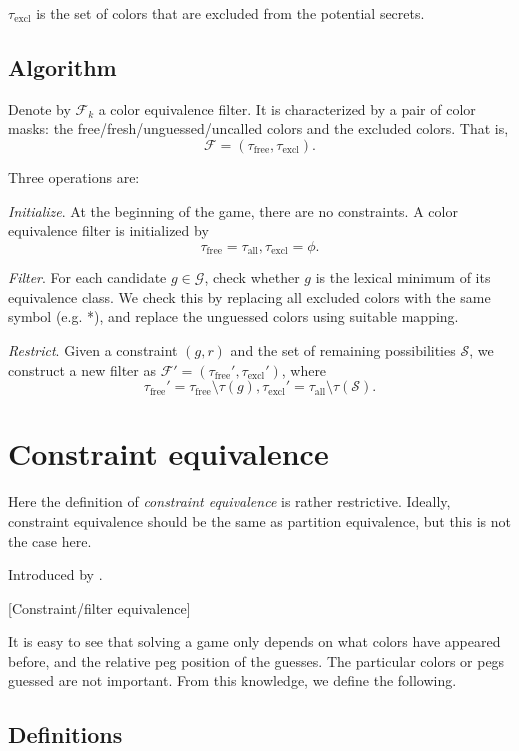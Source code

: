 $\tau_{\text{excl}}$ is the set of colors that are excluded from the potential secrets.


\subsection{Algorithm}

\newcommand{\cmall}{\tau_\text{all}}
\newcommand{\cmfree}{\tau_\text{free}}
\newcommand{\cmexcl}{\tau_\text{excl}}

Denote by $\mathcal{F}_k$ a color equivalence filter. It is characterized by a pair of color masks: the free/fresh/unguessed/uncalled colors and the excluded colors. That is,
\[
\mathcal{F} = (\tau_\text{free}, \tau_\text{excl}) .
\]

Three operations are:

\emph{Initialize}. At the beginning of the game, there are no constraints. A color equivalence filter is initialized by
\[
\cmfree = \cmall, \cmexcl = \phi .
\]

\emph{Filter}. For each candidate $g \in \mathcal{G}$, check whether $g$ is the lexical minimum of its equivalence class. We check this by replacing all excluded colors with the same symbol (e.g. *), and replace the unguessed colors using suitable mapping.

\emph{Restrict}. Given a constraint $(g,r)$ and the set of remaining possibilities $\mathcal{S}$, we construct a new filter as $\mathcal{F}' = (\cmfree', \cmexcl')$, where
\[
\cmfree' = \cmfree \setminus \tau(g), \cmexcl' = \cmall \setminus \tau(\mathcal{S})  .
\]


\section{Constraint equivalence}

Here the definition of \emph{constraint equivalence} is rather restrictive. Ideally, constraint equivalence should be the same as partition equivalence, but this is not the case here.

Introduced by \cite{neuwirth81,koyama93}. 

[Constraint/filter equivalence]

It is easy to see that solving a game only depends on what colors have appeared before, and the relative peg position of the guesses. The particular colors or pegs guessed are not important. From this knowledge, we define the following.

\subsection{Definitions}

